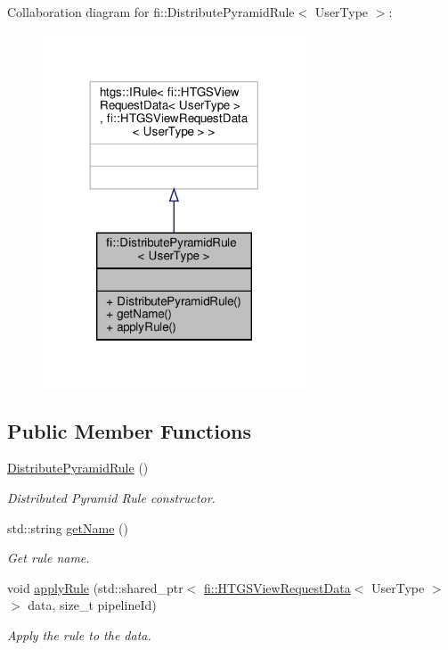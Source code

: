 Collaboration diagram for fi\+:\+:Distribute\+Pyramid\+Rule$<$ User\+Type $>$\+:
\nopagebreak
\begin{figure}[H]
\begin{center}
\leavevmode
\includegraphics[width=221pt]{d1/d55/classfi_1_1DistributePyramidRule__coll__graph}
\end{center}
\end{figure}
\subsection*{Public Member Functions}
\begin{DoxyCompactItemize}
\item 
\hyperlink{classfi_1_1DistributePyramidRule_a09c7e16ed7613f437eb6c0ae5a40c426}{Distribute\+Pyramid\+Rule} ()
\begin{DoxyCompactList}\small\item\em Distributed Pyramid Rule constructor. \end{DoxyCompactList}\item 
std\+::string \hyperlink{classfi_1_1DistributePyramidRule_ad46de4eaa09ac041d05c09ddd6935ece}{get\+Name} ()
\begin{DoxyCompactList}\small\item\em Get rule name. \end{DoxyCompactList}\item 
void \hyperlink{classfi_1_1DistributePyramidRule_a4daacbcfcf56eb5b888112b9e99df9da}{apply\+Rule} (std\+::shared\+\_\+ptr$<$ \hyperlink{classfi_1_1HTGSViewRequestData}{fi\+::\+H\+T\+G\+S\+View\+Request\+Data}$<$ User\+Type $>$$>$ data, size\+\_\+t pipeline\+Id)
\begin{DoxyCompactList}\small\item\em Apply the rule to the data. \end{DoxyCompactList}\end{DoxyCompactItemize}


